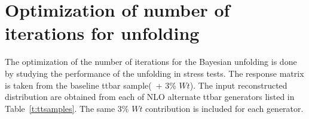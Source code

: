 \section{Optimization of number of iterations for unfolding}
\label{app:stressiter}


The optimization of the number of iterations for the Bayesian unfolding is done by studying the performance of the unfolding in stress tests. The response matrix is taken from the baseline ttbar sample(\powpy\ + 3\% $Wt$). The input reconstructed distribution are obtained from each of NLO alternate ttbar generators listed in Table~\ref{t:ttsamples}. The same 3\% $Wt$ contribution is included for each generator.

